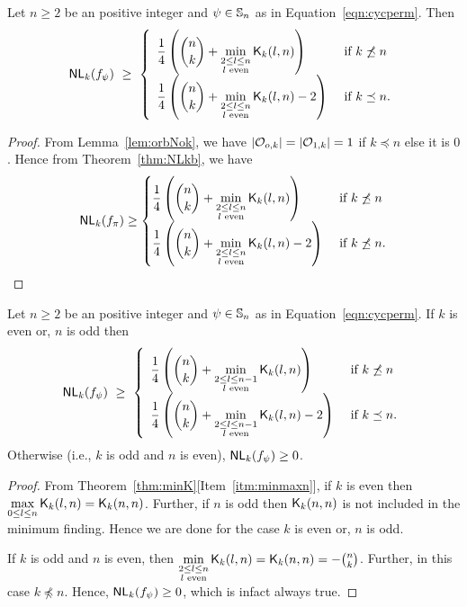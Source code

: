 \documentclass{llncs}
\begin{document}
\begin{theorem}\label{thm:NLk_bound}
Let $n \geq 2$ be an positive integer and $\psi \in \mathbb{S}_n$ as in  Equation~\ref{eqn:cycperm}.
Then $$\mathsf{NL}_{k}(f_\psi) ~\geq ~ 
\left\{ \begin{array}{ll}
\displaystyle{\frac{1}{4}\left({n \choose k} + \min_{\substack{2 \leq l \leq n \\ l \text{ even}}} \mathsf{K}_{k}(l,n)\right)}  & \text{ if }  k \not\preceq n \\
\displaystyle{\frac{1}{4}\left({n \choose k} + \min_{\substack{2 \leq l \leq n \\ l \text{ even}}} \mathsf{K}_{k}(l,n) - 2\right)} & \text{ if } k \preceq n.
\end{array}   \right.$$
\end{theorem}
\begin{proof}
From Lemma~\ref{lem:orbNok}, we have $|\mathcal{O}_{o,k}| = |\mathcal{O}_{1,k}| = 1$ if 
$k \preceq n$ else it is $0$. Hence from Theorem~\ref{thm:NLkb}, we have
$$\mathsf{NL}_{k}(f_\pi) \geq 
\begin{cases}
\displaystyle{\frac{1}{4}\left({n \choose k} + \min_{\substack{2 \leq l \leq n \\ l \text{ even}}} \mathsf{K}_{k}(l,n)\right)} & \text{ if }  k \not\preceq n \\
\displaystyle{\frac{1}{4}\left({n \choose k} + \min_{\substack{2 \leq l \leq n \\ l \text{ even}}} \mathsf{K}_{k}(l,n)-2\right)} & \text{ if }  k \not\preceq n.
\end{cases}$$
\end{proof}
\begin{corollary}\label{cor:NLk_bound}
Let $n \geq 2$ be an positive integer and $\psi \in \mathbb{S}_n$ as in Equation~\ref{eqn:cycperm}. If $k$ is even or,  $n$ is odd then 
$$\mathsf{NL}_{k}(f_\psi) ~\geq ~ 
\left\{ \begin{array}{ll}
\displaystyle{\frac{1}{4}\left({n \choose k} + \min_{\substack{2 \leq l \leq n-1 \\ l \text{ even}}} \mathsf{K}_{k}(l,n)\right)}  & \text{ if }  k \not\preceq n \\
\displaystyle{\frac{1}{4}\left({n \choose k} + \min_{\substack{2 \leq l \leq n-1 \\ l \text{ even}}} \mathsf{K}_{k}(l,n) - 2\right)} & \text{ if } k \preceq n.
\end{array}   \right.$$
Otherwise (i.e., $k$ is odd and $n$ is even), $\mathsf{NL}_{k}(f_\psi) \geq 0$.
\end{corollary}
\begin{proof}
From Theorem~\ref{thm:minK}[Item~\ref{itm:minmaxn}], if $k$ is even then $\max\limits_{0 \leq l \leq n} \mathsf{K}_{k}(l,n) = \mathsf{K}_{k}(n,n)$. Further, if $n$ is odd then $\mathsf{K}_{k}(n,n)$ is not included in the minimum finding. Hence we are done for the case $k$ is even or,  $n$ is odd.

If $k$ is odd and $n$ is even, then $\min\limits_{\substack{2 \leq l \leq n \\ l \text{ even}}} \mathsf{K}_{k}(l,n) = \mathsf{K}_{k}(n,n) = -{n \choose k}$. Further, in this case $k \not\preceq n$. Hence, $\mathsf{NL}_{k}(f_\psi) \geq 0$, which is infact always true.
\end{proof}
\end{document}
